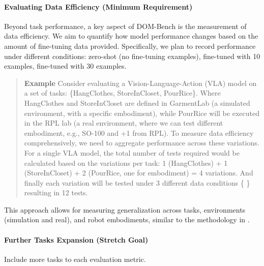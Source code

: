 \paragraph{\textbf{Evaluating Data Efficiency} (Minimum Requirement) }

Beyond task performance, a key aspect of DOM-Bench is the measurement of data efficiency. We aim to quantify how model performance changes based on the amount of fine-tuning data provided. Specifically, we plan to record performance under different conditions: zero-shot (no fine-tuning examples), fine-tuned with 10 examples, fine-tuned with 30 examples.

\begin{quote}
    \textbf{Example} Consider evaluating a Vision-Language-Action (VLA) model on a set of tasks: \{HangClothes, StoreInCloset, PourRice\}. Where HangClothes and StoreInCloset are defined in GarmentLab (a simulated environment, with a specific embodiment), while PourRice will be executed in the RPL lab (a real environment, where we can test different embodiment, e.g., SO-100 and +1 from RPL). To measure data efficiency comprehensively, we need to aggregate performance across these variations. For a single VLA model, the total number of tests required would be calculated based on the variations per task: 1 (HangClothes) + 1 (StoreInCloset) + 2 (PourRice, one for embodiment) = 4 variations. And finally each variation will be tested under 3 different data conditions \{  \} resulting in 12 tests.
\end{quote}



This approach allows for measuring generalization across tasks, environments (simulation and real), and robot embodiments, similar to the methodology in \cite{TransferWelle}.

\paragraph{\textbf{Further Tasks Expansion} (Stretch Goal) } Include more tasks to each evaluation metric.

